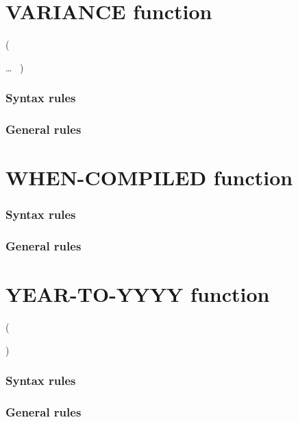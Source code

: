 \section{VARIANCE function}

\begin{syntax}
    (
  \begin{1=}
    \argument
  \end{1=}\ldots
  \ {})
\end{syntax}

\subsubsection{Syntax rules}

\subsubsection{General rules}

\section{WHEN-COMPILED function}

\begin{syntax}
   
\end{syntax}

\subsubsection{Syntax rules}

\subsubsection{General rules}

\section{YEAR-TO-YYYY function}

\begin{syntax}
    ( \argument
  \begin{0-1}
    \argument
    \begin{0-1}
      \argument
    \end{0-1}
  \end{0-1}
  )
\end{syntax}

\subsubsection{Syntax rules}

\subsubsection{General rules}

